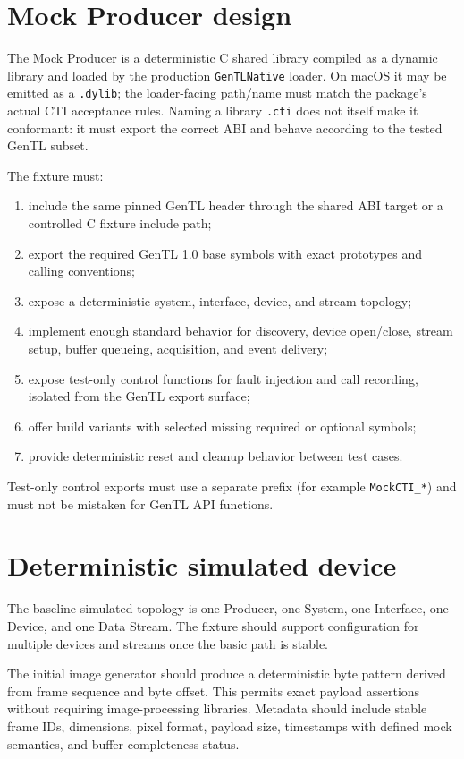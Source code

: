 \documentclass[11pt,a4paper]{report}
\begin{document}
\section{Mock Producer design}
The Mock Producer is a deterministic C shared library compiled as a dynamic library and loaded by the production \texttt{GenTLNative} loader. On macOS it may be emitted as a \texttt{.dylib}; the loader-facing path/name must match the package's actual CTI acceptance rules. Naming a library \texttt{.cti} does not itself make it conformant: it must export the correct ABI and behave according to the tested GenTL subset.

The fixture must:
\begin{enumerate}
  \item include the same pinned GenTL header through the shared ABI target or a controlled C fixture include path;
  \item export the required GenTL 1.0 base symbols with exact prototypes and calling conventions;
  \item expose a deterministic system, interface, device, and stream topology;
  \item implement enough standard behavior for discovery, device open/close, stream setup, buffer queueing, acquisition, and event delivery;
  \item expose test-only control functions for fault injection and call recording, isolated from the GenTL export surface;
  \item offer build variants with selected missing required or optional symbols;
  \item provide deterministic reset and cleanup behavior between test cases.
\end{enumerate}

Test-only control exports must use a separate prefix (for example \texttt{MockCTI\_*}) and must not be mistaken for GenTL API functions.

\section{Deterministic simulated device}
The baseline simulated topology is one Producer, one System, one Interface, one Device, and one Data Stream. The fixture should support configuration for multiple devices and streams once the basic path is stable.

The initial image generator should produce a deterministic byte pattern derived from frame sequence and byte offset. This permits exact payload assertions without requiring image-processing libraries. Metadata should include stable frame IDs, dimensions, pixel format, payload size, timestamps with defined mock semantics, and buffer completeness status.
\end{document}
